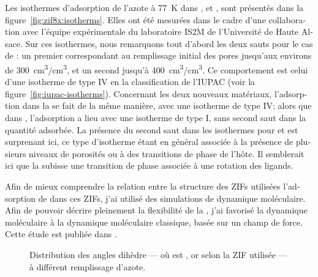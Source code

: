 \documentclass[thesis]{subfiles}
\begin{document}
\begin{otherlanguage}{french}
Les isothermes d'adsorption de l'azote à \SI{77}{K} dans , \ZIFCl et
\ZIFBr, sont présentés dans la figure~\ref{fig:zif8x:isotherms}. Elles ont été
mesurées dans le cadre d'une collaboration avec l'équipe expérimentale du
laboratoire IS2M de l'Université de Haute Alsace. Sur ces isothermes, nous
remarquons tout d'abord les deux sauts pour le cas de : un premier
correspondant au remplissage initial des pores jusqu'aux environs de
\SI{300}{cm^3/cm^3}, et un second jusqu'à \SI{400}{cm^3/cm^3}. Ce comportement
est celui d'une isotherme de type IV en la classification de
l'IUPAC\cite{Sing1985} (voir la figure~\ref{fig:iupac-isotherms}). Concernant
les deux nouveaux matériaux, l'adsorption dans la \ZIFCl se fait de la même
manière, avec une isotherme de type IV; alors que dans \ZIFBr, l'adsorption a
lieu avec une isotherme de type I, sans second saut dans la quantité adsorbée.
La présence du second saut dans les isothermes pour  et \ZIFCl est
surprenant ici, ce type d'isotherme étant en général associée à la présence de
plusieurs niveaux de porosités ou à des transitions de phase de l'hôte. Il
semblerait ici que la  subisse une transition de phase associée à une
rotation des ligands\cite{Moggach2009, FairenJimenez2011}.

Afin de mieux comprendre la relation entre la structure des ZIFs utilisées
l'adsorption de  dans ces ZIFs, j'ai utilisé des simulations de dynamique
moléculaire. Afin de pouvoir décrire pleinement la flexibilité de la , j'ai
favorisé la dynamique moléculaire \abinitio à la dynamique moléculaire
classique, basée sur un champ de force. Cette étude est publiée dans
\cite{Chaplais2018}.

\begin{figure}[ht]
    \centering
    
    \caption{Distribution des angles dihèdre  --- où  est
    ,  or  selon la ZIF utilisée --- à différent
    remplissage d'azote.}
    \label{fig:fr:zif8x:dihedrals}
\end{figure}


\end{otherlanguage}
\end{document}
